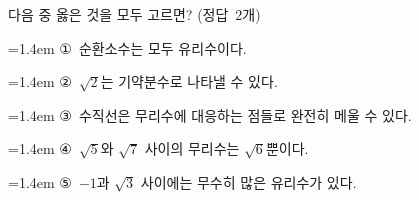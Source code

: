 다음 중 옳은 것을 모두 고르면? \mbox{(정답 2개)}
\par\medskip\par\noindent\hangindent=1.4em {\small ①}\ 순환소수는 모두 유리수이다.\par\noindent\hangindent=1.4em {\small ②}\ $\sqrt{2}$는 기약분수로 나타낼 수 있다.\par\noindent\hangindent=1.4em {\small ③}\ 수직선은 무리수에 대응하는 점들로 완전히 메울 수 있다.\par\noindent\hangindent=1.4em {\small ④}\ $\sqrt{5}$와 $\sqrt{7}$ 사이의 무리수는 $\sqrt{6}$뿐이다.\par\noindent\hangindent=1.4em {\small ⑤}\ $-1$과 $\sqrt{3}$ 사이에는 무수히 많은 유리수가 있다.\par\medskip
